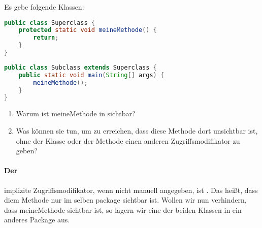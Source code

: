 Es gebe folgende Klassen:
\begin{lstlisting}[label={lst:superclass-original}, caption={Superclass}, language=java]
public class Superclass {
    protected static void meineMethode() {
        return;
    }
}
\end{lstlisting}
\begin{lstlisting}[label={lst:subclass-original}, caption={Subclass}, language=java]
public class Subclass extends Superclass {
    public static void main(String[] args) {
        meineMethode();
    }
}
\end{lstlisting}

\begin{enumerate}
    \item Warum ist meineMethode\(\) in  sichtbar?
    \item Was können sie tun, um zu erreichen, dass diese Methode dort unsichtbar ist, ohne der Klasse oder der Methode einen anderen Zugriffsmodifikator zu geben?
\end{enumerate}

\paragraph{Der} implizite Zugriffsmodifikator, wenn nicht manuell angegeben, ist .
Das heißt, dass diem Methode nur im selben package sichtbar ist.
Wollen wir nun verhindern, dass meineMethode\(\) sichtbar ist, so lagern wir eine der beiden Klassen in ein anderes Package aus.